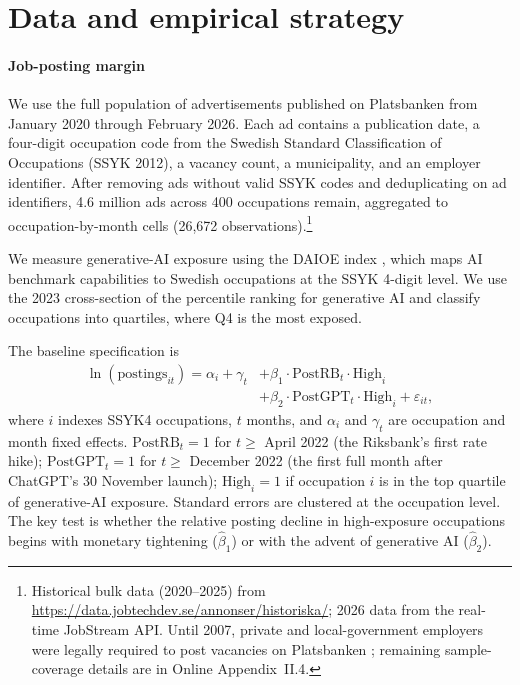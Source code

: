 \documentclass[preprint,12pt,authoryear]{elsarticle}
\begin{document}
\section{Data and empirical strategy}\label{sec:data}

\paragraph{Job-posting margin} We use the full population of advertisements published on Platsbanken from January 2020 through February 2026. Each ad contains a publication date, a four-digit occupation code from the Swedish Standard Classification of Occupations (SSYK 2012), a vacancy count, a municipality, and an employer identifier. After removing ads without valid SSYK codes and deduplicating on ad identifiers, 4.6 million ads across 400 occupations remain, aggregated to occupation-by-month cells (26{,}672 observations).\footnote{Historical bulk data (2020--2025) from \url{https://data.jobtechdev.se/annonser/historiska/}; 2026 data from the real-time JobStream API. Until 2007, private and local-government employers were legally required to post vacancies on Platsbanken \citep{cronert2021regulatory}; remaining sample-coverage details are in Online Appendix~II.4.}

We measure generative-AI exposure using the DAIOE index \citep{engberg2024daioe}, which maps AI benchmark capabilities to Swedish occupations at the SSYK 4-digit level. We use the 2023 cross-section of the percentile ranking for generative AI and classify occupations into quartiles, where Q4 is the most exposed.

The baseline specification is
\begin{equation}\label{eq:did}
\begin{split}
\ln(\text{postings}_{it}) = \alpha_i + \gamma_t &+ \beta_1 \cdot \text{PostRB}_t \cdot \text{High}_i \\
&+ \beta_2 \cdot \text{PostGPT}_t \cdot \text{High}_i + \varepsilon_{it},
\end{split}
\end{equation}
where $i$ indexes SSYK4 occupations, $t$ months, and $\alpha_i$ and $\gamma_t$ are occupation and month fixed effects. $\text{PostRB}_t = 1$ for $t \geq$ April 2022 (the Riksbank's first rate hike); $\text{PostGPT}_t = 1$ for $t \geq$ December 2022 (the first full month after ChatGPT's 30 November launch); $\text{High}_i = 1$ if occupation $i$ is in the top quartile of generative-AI exposure. Standard errors are clustered at the occupation level. The key test is whether the relative posting decline in high-exposure occupations begins with monetary tightening ($\hat\beta_1$) or with the advent of generative AI ($\hat\beta_2$).
\end{document}

